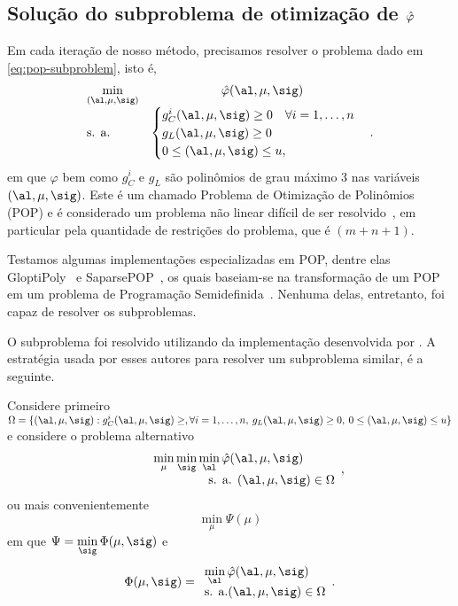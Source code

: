\subsection{Solução do subproblema de otimização \texorpdfstring{de $\hat{\varphi}$}{da função de mérito}}

Em cada iteração de nosso método, precisamos resolver o problema dado em \eqref{eq:pop-subproblem}, isto é, 
\begin{equation}
	\label{eq:pop-subproblem-1}
	\begin{array}{lc}
\displaystyle \min_{(\al,\mu,\sig)} & \hat\varphi(\al,\mu,\sig) \\
\text{s. a.} &\begin{cases} g_C^i(\al,\mu,\sig) \geq 0 \quad \forall i = 1,\ldots,n \\
				g_L(\al,\mu,\sig)   \geq 0 	\\
				 0\leq (\al,\mu,\sig) \leq u,
				 	
				 \end{cases}.
\end{array}
\end{equation}
em que $\varphi$ bem como $g_{C}^{i}$ e $g_{L}$ são polinômios de grau máximo 3 nas variáveis $(\al,\mu,\sig)$. Este é um chamado Problema de Otimização de Polinômios (POP) e é considerado um problema não linear  difícil de ser resolvido~\cite{Laurent:2010kp}, em particular pela quantidade de restrições do problema, que é  $(m+n+1)$. 

Testamos algumas  implementações especializadas em POP, dentre elas GloptiPoly~\cite{Henrion:2009eb} e SaparsePOP~\cite{Waki:2008ie}, os quais baseiam-se na transformação de um POP em um problema de Programação Semidefinida~\cite{Lasserre:2001fw}. Nenhuma delas, entretanto, foi capaz de resolver os subproblemas. 


O subproblema foi resolvido utilizando da implementação desenvolvida por \textcite{VillasBoas:2012ur,VillasBoas2013:wn}. A estratégia usada por esses autores para resolver um subproblema similar, é a seguinte.

Considere primeiro $\Omega = \{(\al,\mu,\sig): g_C^i(\al,\mu,\sig) \geq, \forall i = 1,\ldots,n,\: g_L(\al,\mu,\sig)   \geq 0,\:		 0\leq (\al,\mu,\sig) \leq u\}$ e considere o problema alternativo
\begin{equation}
		\label{eq:pop-subproblem-2}
	\begin{array}{c}
\displaystyle \min_{\mu} \min_{\sig} \min_{\al}  \nextphi(\al,\mu,\sig) \\
\qquad\qquad\qquad\quad \text{s. a. }  (\al,\mu,\sig) \in \Omega
\end{array},
\end{equation}
ou mais convenientemente 
\[
\displaystyle \min_{\mu}\Psi(\mu)
\]
em que  $\displaystyle \Psi = \min_{\sig}\Phi(\mu,\sig)$ e 
\[
\Phi(\mu,\sig) = 
	\begin{array}{l}
\displaystyle \min_{\al}  \nextphi(\al,\mu,\sig) \\
\text{s. a.}  (\al,\mu,\sig) \in\Omega
\end{array}.
\]
  
